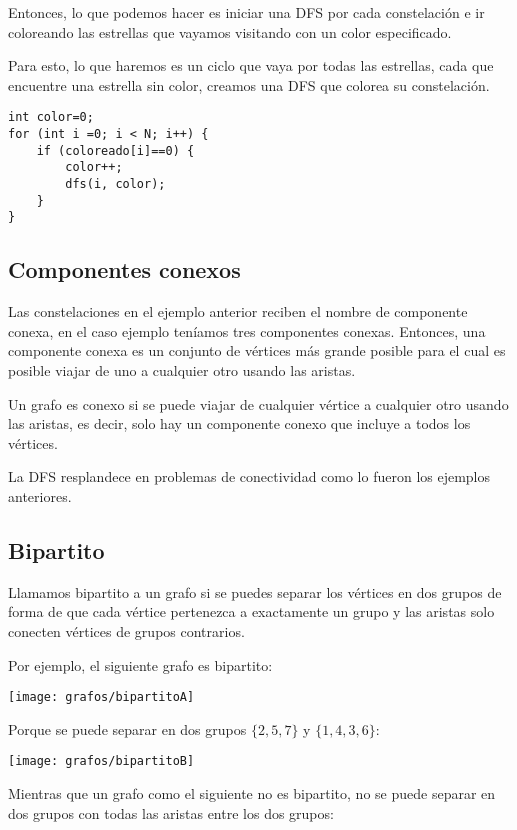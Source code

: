 Entonces, lo que podemos hacer es iniciar una DFS por cada constelación e ir coloreando las estrellas que vayamos visitando con un color especificado. 

Para esto, lo que haremos es un ciclo que vaya por todas las estrellas, cada que encuentre una estrella sin color, creamos una DFS que colorea su constelación.

\begin{lstlisting}
int color=0;
for (int i =0; i < N; i++) {
	if (coloreado[i]==0) {
		color++;
		dfs(i, color);
	}
}
\end{lstlisting}

\subsection{Componentes conexos}

Las constelaciones en el ejemplo anterior reciben el nombre de componente conexa, en el caso ejemplo teníamos tres componentes conexas. Entonces, una componente conexa es un conjunto de vértices más grande posible para el cual es posible viajar de uno a cualquier otro usando las aristas.

Un grafo es conexo si se puede viajar de cualquier vértice a cualquier otro usando las aristas, es decir, solo hay un componente conexo que incluye a todos los vértices.

La DFS resplandece en problemas de conectividad como lo fueron los ejemplos anteriores.

\subsection{Bipartito}
Llamamos bipartito a un grafo si se puedes separar los vértices en dos grupos de forma de que cada vértice pertenezca a exactamente un grupo y las aristas solo conecten vértices de grupos contrarios.

Por ejemplo, el siguiente grafo es bipartito:

\begin{center}
\texttt{[image: grafos/bipartitoA]}
\end{center}

Porque se puede separar en dos grupos \(\{2, 5, 7\}\) y \(\{1, 4, 3, 6\}\):	

\begin{center}
	\texttt{[image: grafos/bipartitoB]}
\end{center}

Mientras que un grafo como el siguiente no es bipartito, no se puede separar en dos grupos con todas las aristas entre los dos grupos:

